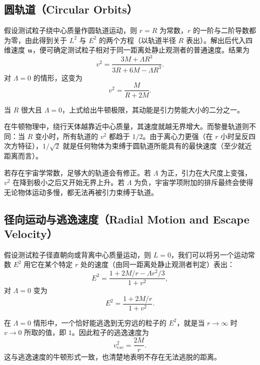 \subsection{圆轨道（Circular Orbits）}

假设测试粒子绕中心质量作圆轨道运动，则 $r=R$ 为常数，$r$ 的一阶与二阶导数都为零，由此得到关于 $L^{2}$ 与 $E^{2}$ 的两个方程（以轨道半径 $R$ 表出）。解出后代入四维速度 $\mathbf{u}$，便可确定测试粒子相对于同一距离处静止观测者的普通速度。结果为
\begin{equation*}
v^{2}=\frac{3M+\Lambda R^{3}}{3R+6M-\Lambda R^{3}}.
\end{equation*}
对 $\Lambda=0$ 的情形，这变为
\begin{equation*}
v^{2}=\frac{M}{R+2M}.
\end{equation*}

当 $R$ 很大且 $\Lambda=0$，上式给出牛顿极限，其动能是引力势能大小的二分之一。

在牛顿物理中，绕行天体越靠近中心质量，其速度就越无界增大。而黎曼轨道则不同：当 $R$ 变小时，所有轨道的 $v^{2}$ 都趋于 $1/2$。由于离心力更强（在 $r$ 小时呈反四次方特征），$1/\sqrt2$ 就是任何物体为束缚于圆轨道所能具有的最快速度（至少就近距离而言）。

若存在宇宙学常数，足够大的轨道会有修正。若 $\Lambda$ 为正，引力在大尺度上变强，$v^{2}$ 在降到极小之后又开始无界上升。若 $\Lambda$ 为负，宇宙学项附加的排斥最终会使得无论物体运动多慢，都无法再被引力束缚于轨道。


\subsection{径向运动与逃逸速度（Radial Motion and Escape Velocity）}

假设测试粒子径直朝向或背离中心质量运动，则 $L=0$，我们可以将另一个运动常数 $E^{2}$ 用它在某个特定 $r$ 处的速度（由同一距离处静止观测者判定）表出：
\begin{equation*}
E^{2}=\frac{1+2M/r-\Lambda r^{2}/3}{1+v^{2}},
\end{equation*}
对 $\Lambda=0$ 变为
\begin{equation*}
E^{2}=\frac{1+2M/r}{1+v^{2}}.
\end{equation*}

在 $\Lambda=0$ 情形中，一个恰好能逃逸到无穷远的粒子的 $E^{2}$，就是当 $r\to\infty$ 时 $v\to0$ 所取的值，即 $1$。因此粒子的逃逸速度为
\begin{equation*}
v_{esc}^{2}=\frac{2M}{r}.
\end{equation*}
这与逃逸速度的牛顿形式一致，也清楚地表明不存在无法逃脱的距离。

